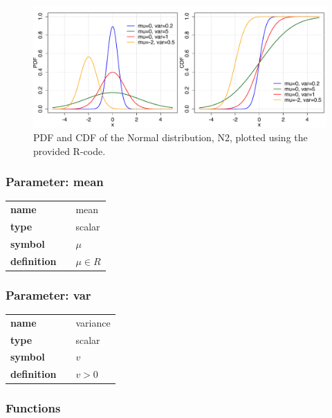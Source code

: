 \begin{figure}[htb!]
\centering
  \includegraphics[width=140mm]{pics/Normal2_pdf_cdf.pdf}
 \caption{PDF and CDF of the Normal distribution, N2,
 plotted using the provided R-code.}
 \label{fig:N2pdfcdf}
\end{figure}

\subsubsection*{Parameter: mean}

\noindent\begin{tabular}{p{2cm}cl}
\textbf{name} & & mean \\
\textbf{type} & & scalar \\
\textbf{symbol} & & $\mu$  \\
\textbf{definition} & & $\mu \in  R$
\end{tabular}
\subsubsection*{Parameter: var}

\noindent\begin{tabular}{p{2cm}cl}
\textbf{name} & & variance \\
\textbf{type} & & scalar \\
\textbf{symbol} & & $v$  \\
\textbf{definition} & & $v>0$
\end{tabular}
\subsubsection*{Functions}

